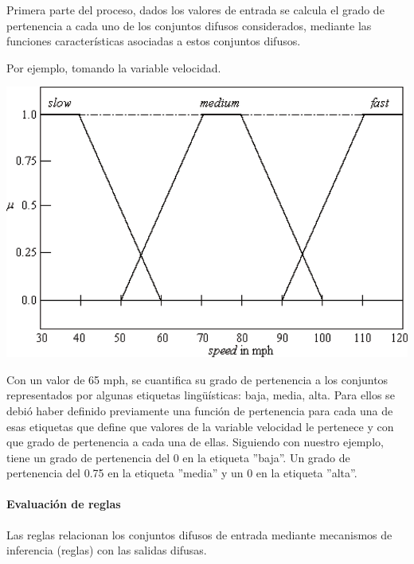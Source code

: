 Primera parte del proceso, dados los valores de entrada se calcula el grado de pertenencia a cada uno de los conjuntos difusos considerados, mediante las funciones características asociadas a estos conjuntos difusos.\par

Por ejemplo, tomando la variable velocidad.\par

\begin{center}
    \includegraphics[scale=0.25]{Tesis/Capitulos/02_MARCO_TEORICO/img/speed.png}
\end{center}

Con un valor de 65 mph, se cuantifica su grado de pertenencia a los conjuntos representados por algunas etiquetas lingüísticas: baja, media, alta. Para ellos se debió haber definido previamente una función de pertenencia para cada una de esas etiquetas que define que valores de la variable velocidad le pertenece y con que grado de pertenencia a cada una de ellas. Siguiendo con nuestro ejemplo, tiene un grado de pertenencia del 0 en la etiqueta ''baja''. Un grado de pertenencia del 0.75 en la etiqueta ''media'' y un 0 en la etiqueta ''alta''.\par

\paragraph{Evaluación de reglas}

Las reglas relacionan los conjuntos difusos de entrada mediante mecanismos de inferencia (reglas) con las salidas difusas.\par

